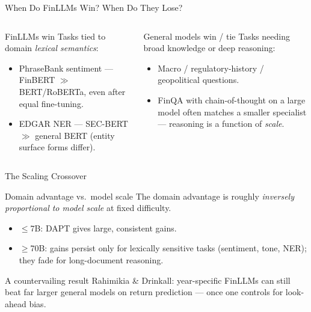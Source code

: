 \documentclass[9pt,t]{beamer}
\begin{document}
\begin{frame}{When Do FinLLMs Win? When Do They Lose?}
\begin{columns}[T]
\begin{block}{FinLLMs win}
Tasks tied to domain \emph{lexical semantics}:
\begin{itemize}
  \item PhraseBank sentiment --- FinBERT $\gg$ BERT/RoBERTa, even after equal
        fine-tuning.
  \item EDGAR NER --- SEC-BERT $\gg$ general BERT (entity surface forms differ).
\end{itemize}
\end{block}
\begin{alertblock}{General models win / tie}
Tasks needing broad knowledge or deep reasoning:
\begin{itemize}
  \item Macro / regulatory-history / geopolitical questions.
  \item FinQA with chain-of-thought on a large model often matches a smaller
        specialist --- reasoning is a function of \emph{scale}.
\end{itemize}
\end{alertblock}
\end{columns}
\end{frame}

\begin{frame}{The Scaling Crossover}
\begin{block}{Domain advantage vs.\ model scale}
The domain advantage is roughly \emph{inversely proportional to model scale} at fixed
difficulty.
\begin{itemize}
  \item $\le$7B: DAPT gives large, consistent gains.
  \item $\ge$70B: gains persist only for lexically sensitive tasks (sentiment, tone,
        NER); they fade for long-document reasoning.
\end{itemize}
\end{block}

\medskip
\begin{exampleblock}{A countervailing result}
Rahimikia \& Drinkall: year-specific FinLLMs can still beat far larger general models
on return prediction --- once one controls for look-ahead bias.
\end{exampleblock}
\end{frame}
\end{document}
